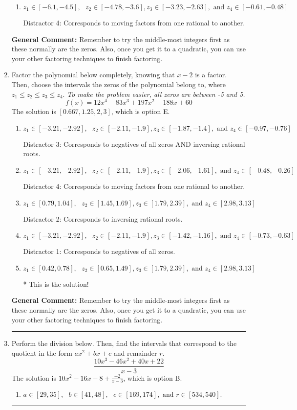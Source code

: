 \documentclass{extbook}[14pt]
\newcommand{\litem}[1]{\item #1

\rule{\textwidth}{0.4pt}}
\begin{document}
\begin{enumerate}
{\begin{enumerate}[label=\Alph*.]
 Distractor 1: Corresponds to negatives of all zeros.
\item \( z_1 \in [-6.1, -4.5], \text{   }  z_2 \in [-4.78, -3.6], z_3 \in [-3.23, -2.63], \text{   and   } z_4 \in [-0.61, -0.48] \)

 Distractor 4: Corresponds to moving factors from one rational to another.
\end{enumerate}

\textbf{General Comment:} Remember to try the middle-most integers first as these normally are the zeros. Also, once you get it to a quadratic, you can use your other factoring techniques to finish factoring.
}
\litem{
Factor the polynomial below completely, knowing that $x -2$ is a factor. Then, choose the intervals the zeros of the polynomial belong to, where $z_1 \leq z_2 \leq z_3 \leq z_4$. \textit{To make the problem easier, all zeros are between -5 and 5.}
\[ f(x) = 12x^{4} -83 x^{3} +197 x^{2} -188 x + 60 \]The solution is \( [0.667, 1.25, 2, 3] \), which is option E.\begin{enumerate}[label=\Alph*.]
\item \( z_1 \in [-3.21, -2.92], \text{   }  z_2 \in [-2.11, -1.9], z_3 \in [-1.87, -1.4], \text{   and   } z_4 \in [-0.97, -0.76] \)

 Distractor 3: Corresponds to negatives of all zeros AND inversing rational roots.
\item \( z_1 \in [-3.21, -2.92], \text{   }  z_2 \in [-2.11, -1.9], z_3 \in [-2.06, -1.61], \text{   and   } z_4 \in [-0.48, -0.26] \)

 Distractor 4: Corresponds to moving factors from one rational to another.
\item \( z_1 \in [0.79, 1.04], \text{   }  z_2 \in [1.45, 1.69], z_3 \in [1.79, 2.39], \text{   and   } z_4 \in [2.98, 3.13] \)

 Distractor 2: Corresponds to inversing rational roots.
\item \( z_1 \in [-3.21, -2.92], \text{   }  z_2 \in [-2.11, -1.9], z_3 \in [-1.42, -1.16], \text{   and   } z_4 \in [-0.73, -0.63] \)

 Distractor 1: Corresponds to negatives of all zeros.
\item \( z_1 \in [0.42, 0.78], \text{   }  z_2 \in [0.65, 1.49], z_3 \in [1.79, 2.39], \text{   and   } z_4 \in [2.98, 3.13] \)

* This is the solution!
\end{enumerate}

\textbf{General Comment:} Remember to try the middle-most integers first as these normally are the zeros. Also, once you get it to a quadratic, you can use your other factoring techniques to finish factoring.
}
\litem{
Perform the division below. Then, find the intervals that correspond to the quotient in the form $ax^2+bx+c$ and remainder $r$.
\[ \frac{10x^{3} -46 x^{2} +40 x + 22}{x -3} \]The solution is \( 10x^{2} -16 x -8 + \frac{-2}{x -3} \), which is option B.\begin{enumerate}[label=\Alph*.]
\item \( a \in [29, 35], \text{   } b \in [41, 48], \text{   } c \in [169, 174], \text{   and   } r \in [534, 540]. \)


\end{enumerate}}
\end{enumerate}
\end{document}
